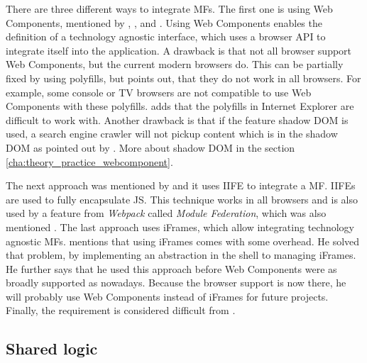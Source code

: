 There are three different ways to integrate \acp{MF}.
The first one is using Web Components, mentioned by \textciteMezzalira{}, \textciteRehm{}, \textciteHuber{} and \textciteOlleck{}.
Using Web Components enables the definition of a technology agnostic interface, which uses a browser \ac{API} to integrate itself into the application.
A drawback is that not all browser support Web Components, but the current modern browsers do\footnotemark.
This can be partially fixed by using polyfills\footnotemark, but \citeauthorMezzalira{} points out, that they do not work in all browsers.
For example, some console or TV browsers are not compatible to use Web Components with these polyfills.
\citeauthorOlleck{} adds that the polyfills in Internet Explorer are difficult to work with.
Another drawback is that if the feature shadow \ac{DOM} is used, a search engine crawler will not pickup content which is in the shadow \ac{DOM} as pointed out by \citeauthorMezzalira{}.
More about shadow \ac{DOM} in the section \ref{cha:theory_practice_webcomponent}.

The next approach was mentioned by \textciteMezzalira{} and it uses \ac{IIFE} to integrate a \ac{MF}.
\acp{IIFE} are used to fully encapsulate \ac{JS}.
This technique works in all browsers and is also used by a feature from \textit{Webpack} called \textit{Module Federation}\footnotemark, which was also mentioned \citeauthorMezzalira{}.
The last approach uses iFrames, which allow integrating technology agnostic \acp{MF}.
\textciteSteyer{} mentions that using iFrames comes with some overhead.
He solved that problem, by implementing an abstraction in the shell to managing iFrames.
He further says that he used this approach before Web Components were as broadly supported as nowadays.
Because the browser support is now there, he will probably use Web Components instead of iFrames for future projects.
Finally, the \textit{} requirement is considered difficult from \textciteOlleck{}.




\subsection{Shared logic}\label{cha:requirement_detail_integration_sharedlogic}

